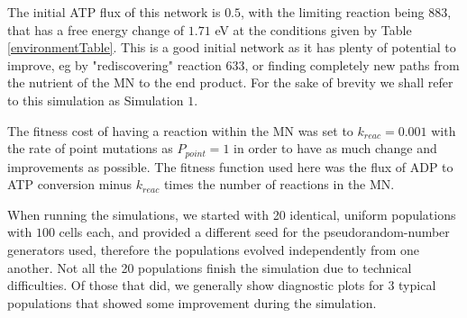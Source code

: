 \documentclass[10pt,a4paper]{article}
\begin{document}
The initial ATP flux of this network is $0.5$, with the limiting reaction being $883$, that has a free energy change of $1.71$ eV at the conditions given by Table \ref{environmentTable}. This is a good initial network as it has plenty of potential to improve, eg by "rediscovering" reaction $633$, or finding completely new paths from the nutrient of the MN to the end product. For the sake of brevity we shall refer to this simulation as Simulation $1$.

The fitness cost of having a reaction within the MN was set to $k_{reac}=0.001$ with the rate of point mutations as $P_{point}=1$ in order to have as much change and improvements as possible. The fitness function used here was the flux of ADP to ATP conversion minus $k_{reac}$ times the number of reactions in the MN.

When running the simulations, we started with 20 identical, uniform populations with $100$ cells each, and provided a different seed for the pseudorandom-number generators used, therefore the populations evolved independently from one another. Not all the 20 populations finish the simulation due to technical difficulties. Of those that did, we generally show diagnostic plots for 3 typical populations that showed some improvement during the simulation.
\end{document}
